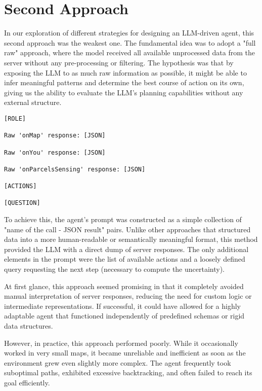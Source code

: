 \section{Second Approach}
\label{sec:second_approach}

In our exploration of different strategies for designing an LLM-driven agent,
this second approach was the weakest one. The fundamental idea was to adopt a "full
raw" approach, where the model received all available unprocessed data from the
server without any pre-processing or filtering. The hypothesis was that by exposing
the LLM to as much raw information as possible, it might be able to infer
meaningful patterns and determine the best course of action on its own, giving us
the ability to evaluate the LLM's planning capabilities without any external structure.
\vspace{1mm}
\begin{codewindow}
  [Text]  \begin{lstlisting}
[ROLE]

Raw 'onMap' response: [JSON]

Raw 'onYou' response: [JSON]

Raw 'onParcelsSensing' response: [JSON]

[ACTIONS]

[QUESTION]
\end{lstlisting}
\end{codewindow}
\vspace{1mm}

To achieve this, the agent's prompt was constructed as a simple collection of "name
of the call - JSON result" pairs. Unlike other approaches that structured data into
a more human-readable or semantically meaningful format, this method provided
the LLM with a direct dump of server responses. The only additional elements in the
prompt were the list of available actions and a loosely defined query requesting
the next step (necessary to compute the uncertainty).

At first glance, this approach seemed promising in that it completely avoided
manual interpretation of server responses, reducing the need for custom logic or
intermediate representations. If successful, it could have allowed for a highly adaptable
agent that functioned independently of predefined schemas or rigid data structures.

However, in practice, this approach performed poorly. While it occasionally
worked in very small maps, it became unreliable and inefficient as soon as the environment
grew even slightly more complex. The agent frequently took suboptimal paths, exhibited
excessive backtracking, and often failed to reach its goal efficiently.

